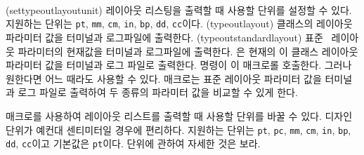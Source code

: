 \begin{syntax}
\cmd{\typeoutlayout} \\
\cmd{\typeoutstandardlayout} \\
\cmd{\settypeoutlayoutunit} \\
\end{syntax}
\glossary(settypeoutlayoutunit)%
  {}%
  {레이아웃 리스팅을 출력할 때 사용할 단위를 설정할 수 있다. 지원하는 단위는 
  \texttt{pt}, \texttt{mm}, \texttt{cm},
    \texttt{in}, \texttt{bp}, \texttt{dd}, \texttt{cc}이다.}
\glossary(typeoutlayout)%
  {}%
  {클래스의 레이아웃 파라미터 값을 터미널과 로그파일에 출력한다.}
\glossary(typeoutstandardlayout)%
  {}%
  {표준 \ltx\ 레이아웃 파라미터의 현재값을 터미널과 로그파일에 출력한다.}
\cmd{\typeoutlayout}은 현재의 이 클래스 레이아웃 파라미터 값을 터미널과 로그 파일로 출력한다. \cmd{\checkandfixthelayout} 명령이 이 매크로롤 호출한다. 그러나 원한다면 어느 때라도 사용할 수 있다.
\cmd{\typeoutstandardlayout} 매크로는 표준 레이아웃 파라미터 값을
터미널과 로그 파일로 출력하여 두 종류의 파라미터 값을 비교할 수 있게 한다.

\cmd{\settypeoutlayoutunit} 매크로를 사용하여 레이아웃 리스트를 출력할 때
사용할 단위를 바꿀 수 있다. 디자인 단위가 예컨대 센티미터일 경우에 편리하다.
지원하는 단위는 \texttt{pt}, \texttt{pc},
\texttt{mm}, \texttt{cm}, \texttt{in}, \texttt{bp}, \texttt{dd},
\texttt{cc}이고 기본값은 \texttt{pt}이다. 단위에 관하여 자세한 것은 \를 보라.

